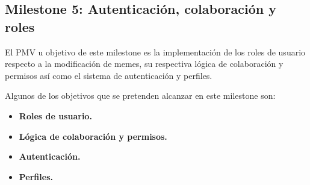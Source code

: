 \subsection{Milestone 5: Autenticación, colaboración y roles}

El PMV u objetivo de este milestone es la implementación de los roles de usuario respecto a la modificación de memes, su respectiva lógica de colaboración y permisos así como el sistema de autenticación y perfiles.

Algunos de los objetivos que se pretenden alcanzar en este milestone son:

\begin{itemize}
  \item \textbf{Roles de usuario.}
  \item \textbf{Lógica de colaboración y permisos.}
  \item \textbf{Autenticación.}
  \item \textbf{Perfiles.}
\end{itemize}


